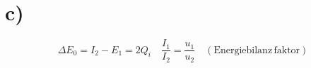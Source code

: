 

\section*{c)}
\[
\Delta E_0 = I_2 - E_1 = 2Q_i \quad \frac{I_1}{I_2} = \frac{u_1}{u_2} \quad (\text{Energiebilanz} \, \text{faktor})
\]